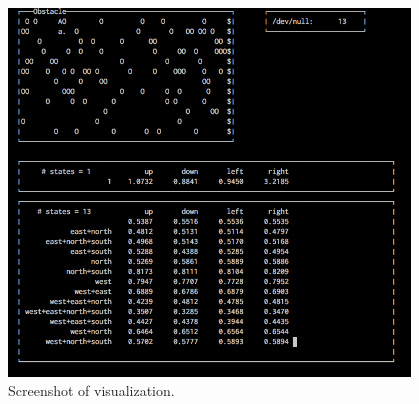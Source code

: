 \documentclass[11pt]{report}
\begin{document}
\begin{figure}[H]
  \centering
  \includegraphics[width=0.95\textwidth]{curses.png}
  \caption{Screenshot of visualization.}
\end{figure}
\end{document}
